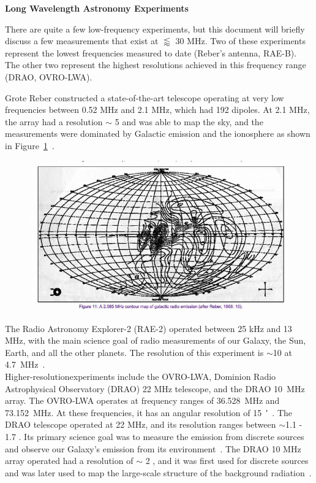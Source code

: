 	    {\bf{Long Wavelength Astronomy Experiments}}
	    
	    There are quite a few low-frequency experiments, but this document will briefly discuss a few measurements that exist at $\lessapprox$ 30 MHz. Two of these experiments represent the lowest frequencies measured to date (Reber's antenna, RAE-B). The other two represent the highest resolutions achieved in this frequency range (DRAO, OVRO-LWA).
	    	    
	    Grote Reber constructed a state-of-the-art telescope operating at very low frequencies between 0.52 MHz and 2.1 MHz, which had 192 dipoles. At 2.1 MHz, the array had a resolution $\sim$ 5 \degree and was able to map the sky, and the measurements were dominated by Galactic emission and the ionosphere as shown in Figure~\ref{Fig:Rebermap}~\citep{1988JRASC..82...93R}. 
	    
	    \begin{figure}
			\centering
			\includegraphics[width=0.7\linewidth]{Figures/Rebermap}
			\caption{}
			\label{Fig:Rebermap}
		\end{figure}
	    
	    The Radio Astronomy Explorer-2 (RAE-2) operated between 25 kHz and 13 MHz, with the main science goal of radio measurements of our Galaxy, the Sun, Earth, and all the other planets. The resolution of this experiment is $\sim$10 \degree at \SI{4.7}{\mega\hertz}~\citep{1975A&A....40..365A}.  \\
	    
	    Higher-resolutionexperiments include the OVRO-LWA, Dominion Radio Astrophysical Observatory (DRAO) 22 MHz telescope, and the DRAO \SI{10}{\mega\hertz} array. The OVRO-LWA operates at frequency ranges of \SI{36.528}{\mega\hertz} and \SI{73.152}{\mega\hertz}. At these frequencies, it has an angular resolution of \SI{15}{\arcminute}~\citep{2018AJ....156...32E}. The DRAO telescope operated at 22 MHz, and its resolution ranges between $\sim$1.1 \degree - 1.7 \degree. Its primary science goal was to measure the emission from discrete sources and observe our Galaxy's emission from its environment~\citep{1999A&AS..137....7R}. The DRAO 10 MHz array operated had a resolution of $\sim$ 2  \degree, and it was first used for discrete sources and was later used to map the large-scale structure of the background radiation~\citep{1976MNRAS.177..601C}.
	    
